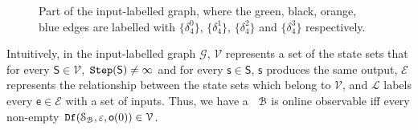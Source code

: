 \begin{figure}[thpb]
      \centering
      \caption{Part of the input-labelled graph, where the green, black, orange, blue edges are labelled with $\{\delta_4^0\}$, $\{\delta_4^1\}$, $\{\delta_4^2\}$ and $\{\delta_4^3\}$ respectively.}
      \label{fig:4}
\end{figure}
Intuitively, in the input-labelled graph $\mathcal{G}$, $\mathcal{V}$ represents a set of the state sets that for every $\mathsf{S}\in \mathcal{V}$, ${\tt Step}(\mathsf{S})\ne \infty$ and for every $\mathsf{s}\in\mathsf{S}$, $\mathsf{s}$ produces the same output, $\mathcal{E}$ represents the relationship between the state sets which belong to $\mathcal{V}$, and $\mathcal{L}$ labels every $\mathsf{e} \in\mathcal{E}$ with a set of inputs. %
Thus, we have a \BCN\ ${\mathcal{B}}$ is online observable iff every non-empty ${\tt Df}(\mathcal{S}_{\mathcal{B}},\varepsilon, \mathsf{o}(0))\in \mathcal{V}$. %


